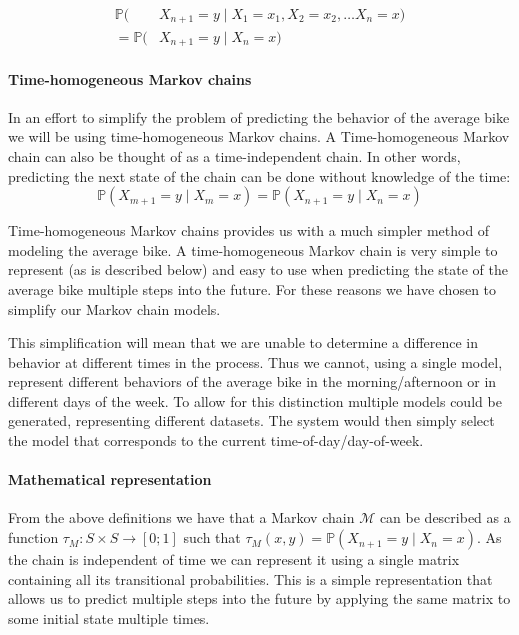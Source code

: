 \begin{align}\label{markov:eq:markov_prob}
\mathbb{P}(&X_{n+1} = y \mid X_1 = x_1, X_2 = x_2, \dots X_n = x)\nonumber\\
= \mathbb{P}(&X_{n+1} = y \mid X_n = x)
\end{align}

\paragraph{Time-homogeneous Markov chains}
In an effort to simplify the problem of predicting the behavior of the average bike we will be using time-homogeneous Markov chains.
A Time-homogeneous Markov chain can also be thought of as a time-independent chain.
In other words, predicting the next state of the chain can be done without knowledge of the time:
\begin{equation}
\mathbb{P}(X_{m+1} = y \mid X_m = x) = \mathbb{P}(X_{n+1} = y \mid X_n = x)
\end{equation}

Time-homogeneous Markov chains provides us with a much simpler method of modeling the average bike.
A time-homogeneous Markov chain is very simple to represent (as is described below) and easy to use when predicting the state of the average bike multiple steps into the future.
For these reasons we have chosen to simplify our Markov chain models.

This simplification will mean that we are unable to determine a difference in behavior at different times in the process.
Thus we cannot, using a single model, represent different behaviors of the average bike in the morning/afternoon or in different days of the week.
To allow for this distinction multiple models could be generated, representing different datasets.
The system would then simply select the model that corresponds to the current time-of-day/day-of-week.

\paragraph{Mathematical representation}\label{markov:math}
From the above definitions we have that a Markov chain $\mathcal{M}$ can be described as a function $\tau_M:S\times S \rightarrow [0;1]$ such that $\tau_M(x, y) = \mathbb{P}(X_{n + 1} = y \mid X_n = x)$.
As the chain is independent of time we can represent it using a single matrix containing all its transitional probabilities.
This is a simple representation that allows us to predict multiple steps into the future by applying the same matrix to some initial state multiple times.

